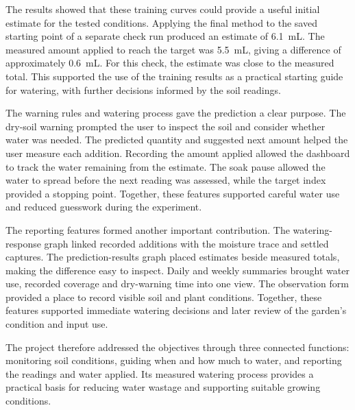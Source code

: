 \documentclass[11pt,a4paper]{article}
\begin{document}
The results showed that these training curves could provide a useful initial estimate for the tested conditions. Applying the final method to the saved starting point of a separate check run produced an estimate of 6.1~mL. The measured amount applied to reach the target was 5.5~mL, giving a difference of approximately 0.6~mL. For this check, the estimate was close to the measured total. This supported the use of the training results as a practical starting guide for watering, with further
decisions informed by the soil readings.

The warning rules and watering process gave the prediction a clear purpose. The dry-soil warning prompted the user to inspect the soil and consider whether water was needed. The predicted quantity and suggested next amount helped the user measure each addition. Recording the amount applied allowed the dashboard to track the water remaining from the estimate. The soak pause allowed the water to spread before the next reading was assessed, while the target index provided a stopping point. Together, these features supported careful water use and reduced guesswork during the experiment.

The reporting features formed another important contribution. The watering-response graph linked recorded additions with the moisture trace and settled captures. The prediction-results graph placed estimates beside measured totals, making the difference easy to inspect. Daily and weekly summaries brought water use, recorded coverage and dry-warning time into one view. The observation form provided a place to record visible soil and plant conditions. Together, these features supported immediate watering decisions and later review of the garden's condition and input use.

The project therefore addressed the objectives through three connected functions: monitoring soil conditions, guiding when and how much to water, and reporting the readings and water applied. Its measured watering process provides a practical basis for reducing water wastage and supporting suitable growing conditions.

\clearpage

\end{document}
